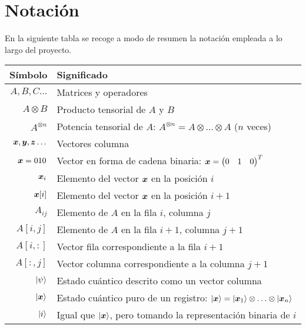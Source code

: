 \chapter{Notación}

En la siguiente tabla se recoge a modo de resumen la notación empleada a lo 
largo del proyecto.

\begin{table}[h]
	\centering
	\begin{tabular}{rl}
		\toprule
		Símbolo & Significado \\
		\midrule
		$A,B,C\ldots$
		& Matrices y operadores\\

		$A \otimes B$
		& Producto tensorial de $A$ y $B$\\

		$A^{\otimes n}$
		& Potencia tensorial de $A$:
		$A^{\otimes n} = A \otimes \ldots \otimes A$ ($n$ veces)\\

		$\boldsymbol{x}, \boldsymbol{y}, \boldsymbol{z}\ldots$
		&Vectores columna\\

		$\boldsymbol{x} = 010$
		&Vector en forma de cadena binaria: $\boldsymbol{x} = \begin{pmatrix} 0 & 1 & 0 \end{pmatrix}^T$\\

		$\boldsymbol{x}_i$
		&Elemento del vector $\boldsymbol{x}$ en la posición $i$\\

		$\boldsymbol{x}[i]$
		&Elemento del vector $\boldsymbol{x}$ en la posición $i+1$\\

		$A_{ij}$
		&Elemento de $A$ en la fila $i$, columna $j$\\

		$A[i,j]$
		&Elemento de $A$ en la fila $i+1$, columna $j+1$\\

		$A[i,:]$
		&Vector fila correspondiente a la fila $i+1$\\

		$A[:,j]$
		&Vector columna correspondiente a la columna $j+1$\\

		$\ket{\psi}$
		&Estado cuántico descrito como un vector columna\\

		$\ket{\boldsymbol{x}}$
		&Estado cuántico puro de un registro:
		$\ket{\boldsymbol{x}} = \ket{\boldsymbol{x}_1} \otimes \ldots \otimes \ket{\boldsymbol{x}_n}$\\

		$\ket{i}$
		&Igual que $\ket{\boldsymbol{x}}$, pero tomando la representación binaria 
		de $i$\\


\end{tabular}
\end{table}
